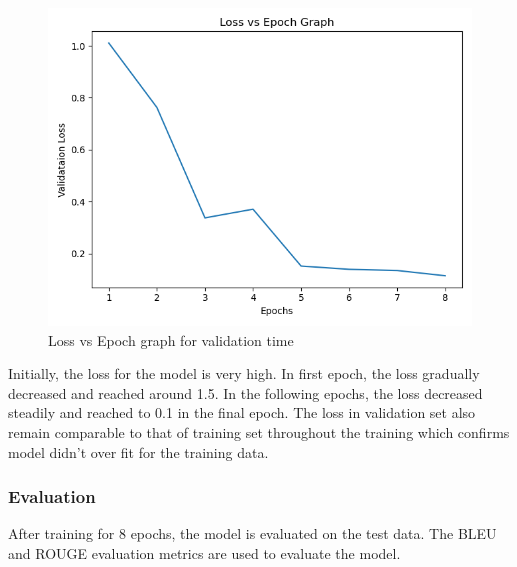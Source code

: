      \begin{figure}[H]
        \includegraphics[scale=.6]{images/Validataion Loss.png}
        \centering
        \caption{Loss vs Epoch graph for validation time}
        \label{fig:lvsepochv}
    \end{figure}


        
Initially, the loss for the model is very high. In first epoch, the loss gradually decreased
and reached around 1.5. In the following epochs, the loss decreased steadily and
reached to 0.1 in the final epoch. The loss in validation set also remain comparable to
that of training set throughout the training which confirms model didn’t over fit for the
training data.
\subsubsection{Evaluation}
After training for 8 epochs, the model is evaluated on the test data. The BLEU and
ROUGE evaluation metrics are used to evaluate the model.

